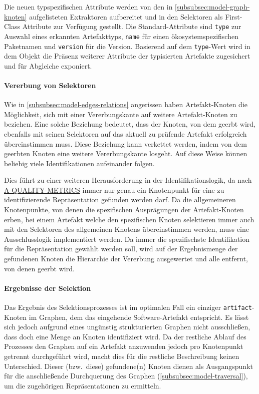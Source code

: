 Die neuen typspezifischen Attribute werden von den in \autoref{subsubsec:model-graph-knoten} aufgelisteten Extraktoren aufbereitet und in den Selektoren als First-Class Attribute zur Verfügung gestellt.
Die Standard-Attribute sind \texttt{type} zur Auswahl eines erkannten Artefakttyps, \texttt{name} für einen ökosystemspezifischen Paketnamen und \texttt{version} für die Version.
Basierend auf dem \texttt{type}-Wert wird in dem Objekt die Präsenz weiterer Attribute der typisierten Artefakte zugesichert und für Abgleiche exponiert.

\paragraph{Vererbung von Selektoren}

Wie in \autoref{subsubsec:model-edges-relations} angerissen haben Artefakt-Knoten die Möglichkeit, sich mit einer Vererbungskante auf weitere Artefakt-Knoten zu beziehen.
Eine solche Beziehung bedeutet, dass der Knoten, von dem geerbt wird, ebenfalls mit seinen Selektoren auf das aktuell zu prüfende Artefakt erfolgreich übereinstimmen muss.
Diese Beziehung kann verkettet werden, indem von dem geerbten Knoten eine weitere Vererbungskante losgeht.
Auf diese Weise können beliebig viele Identifikationen aufeinander folgen.

Dies führt zu einer weiteren Herausforderung in der Identifikationslogik, da nach \hyperref[subsec:req-graph-inner-consistency]{A-QUALITY-METRICS} immer nur genau ein Knotenpunkt für eine zu identifizierende Repräsentation gefunden werden darf.
Da die allgemeineren Knotenpunkte, von denen die spezifischen Ausprägungen der Artefakt-Knoten erben, bei einem Artefakt welche den spezifischen Knoten selektieren immer auch mit den Selektoren des allgemeinen Knotens übereinstimmen werden, muss eine Ausschlusslogik implementiert werden.
Da immer die spezifischste Identifikation für die Repräsentation gewählt werden soll, wird auf der Ergebnismenge der gefundenen Knoten die Hierarchie der Vererbung ausgewertet und alle entfernt, von denen geerbt wird.

\paragraph{Ergebnisse der Selektion}

Das Ergebnis des Selektionsprozesses ist im optimalen Fall ein einziger \texttt{artifact}-Knoten im Graphen, dem das eingehende Software-Artefakt entspricht.
Es lässt sich jedoch aufgrund eines ungünstig strukturierten Graphen nicht ausschließen, dass doch eine Menge an Knoten identifiziert wird.
Da der restliche Ablauf des Prozesses den Graphen auf ein Artefakt anzuwenden jedoch pro Knotenpunkt getrennt durchgeführt wird, macht dies für die restliche Beschreibung keinen Unterschied.
Dieser (bzw.\ diese) gefundene(n) Knoten dienen als Ausgangspunkt für die anschließende Durchquerung des Graphen (\autoref{subsubsec:model-traversal}), um die zugehörigen Repräsentationen zu ermitteln.

